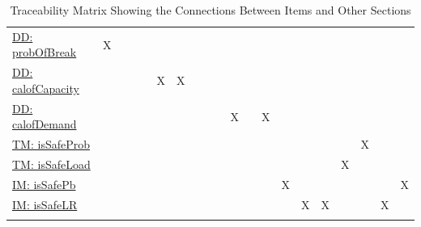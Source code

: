 \documentclass[12pt]{article}
\begin{document}
\begin{longtable}{l l l l l l l l l l l l l l l l l l l l}
\hyperref[DD:probOfBreak]{DD: probOfBreak} & X &  &  &  &  &  &  &  &  &  &  &  &  &  &  &  &  &  & 
\\
\hyperref[DD:calofCapacity]{DD: calofCapacity} &  &  &  &  & X & X &  &  &  &  &  &  &  &  &  &  &  &  & 
\\
\hyperref[DD:calofDemand]{DD: calofDemand} &  &  &  &  &  &  &  &  &  & X &  & X &  &  &  &  &  &  & 
\\
\hyperref[TM:isSafeProb]{TM: isSafeProb} &  &  &  &  &  &  &  &  &  &  &  &  &  &  &  &  & X &  & 
\\
\hyperref[TM:isSafeLoad]{TM: isSafeLoad} &  &  &  &  &  &  &  &  &  &  &  &  &  &  &  & X &  &  & 
\\
\hyperref[IM:isSafePb]{IM: isSafePb} &  &  &  &  &  &  &  &  &  &  &  &  & X &  &  &  &  &  & X
\\
\hyperref[IM:isSafeLR]{IM: isSafeLR} &  &  &  &  &  &  &  &  &  &  &  &  &  & X & X &  &  & X & 
\\
\bottomrule
\caption{Traceability Matrix Showing the Connections Between Items and Other Sections}
\label{Table:TraceMatRefvsRef}
\end{longtable}
\end{document}

